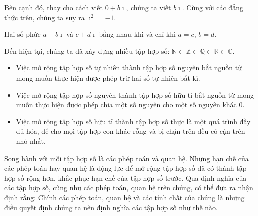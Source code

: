 Bên cạnh đó, thay cho cách viết $0 + b\imath$, chúng ta viết $b\imath$. Cùng với các đẳng thức trên, chúng ta suy ra $\imath^{2} = -1$.

\begin{theorem}
	Hai số phức $a + b\imath$ và $c + d\imath$ bằng nhau khi và chỉ khi $a = c$, $b = d$.
\end{theorem}

Đến hiện tại, chúng ta đã xây dựng nhiều tập hợp số: $\mathbb{N} \subset \mathbb{Z} \subset \mathbb{Q} \subset \mathbb{R} \subset \mathbb{C}$.
\begin{itemize}
	\item Việc mở rộng tập hợp số tự nhiên thành tập hợp số nguyên bắt nguồn từ mong muốn thực hiện được phép trừ hai số tự nhiên bất kì.
	\item Việc mở rộng tập hợp số nguyên thành tập hợp số hữu tỉ bắt nguồn từ mong muốn thực hiện được phép chia một số nguyên cho một số nguyên khác $0$.
	\item Việc mở rộng tập hợp số hữu tỉ thành tập hợp số thực là một quá trình đầy đủ hóa, để cho mọi tập hợp con khác rỗng và bị chặn trên đều có cận trên nhỏ nhất.
\end{itemize}

Song hành với mỗi tập hợp số là các phép toán và quan hệ. Những hạn chế của các phép toán hay quan hệ là động lực để mở rộng tập hợp số đã có thành tập hợp số rộng hơn, khắc phục hạn chế của tập hợp số trước. Qua định nghĩa của các tập hợp số, cũng như các phép toán, quan hệ trên chúng, có thể đưa ra nhận định rằng: Chính các phép toán, quan hệ và các tính chất của chúng là những điều quyết định chúng ta nên định nghĩa các tập hợp số như thế nào.

